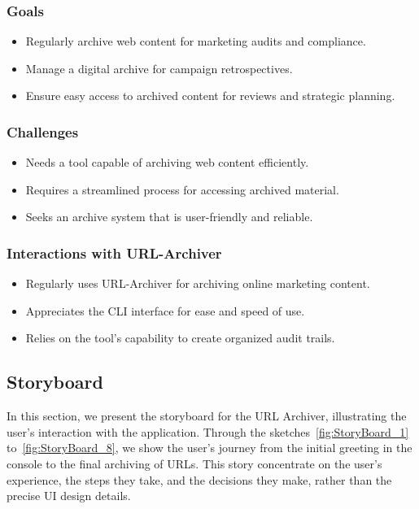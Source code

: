 \subsubsection{Goals}
\begin{itemize}
    \item Regularly archive web content for marketing audits and compliance.
    \item Manage a digital archive for campaign retrospectives.
    \item Ensure easy access to archived content for reviews and strategic planning.
\end{itemize}

\subsubsection{Challenges}
\begin{itemize}
    \item Needs a tool capable of archiving web content efficiently.
    \item Requires a streamlined process for accessing archived material.
    \item Seeks an archive system that is user-friendly and reliable.
\end{itemize}

\subsubsection{Interactions with URL-Archiver}
\begin{itemize}
    \item Regularly uses URL-Archiver for archiving online marketing content.
    \item Appreciates the CLI interface for ease and speed of use.
    \item Relies on the tool's capability to create organized audit trails.
\end{itemize}


\subsection{Storyboard}
In this section, we present the storyboard for the URL Archiver, illustrating the user's interaction with the application.
Through the sketches~\ref{fig:StoryBoard_1} to~\ref{fig:StoryBoard_8}, we show the user's journey from the initial greeting in the console to the final archiving of URLs.
This story concentrate on the user's experience, the steps they take, and the decisions they make, rather than the precise UI design details.

